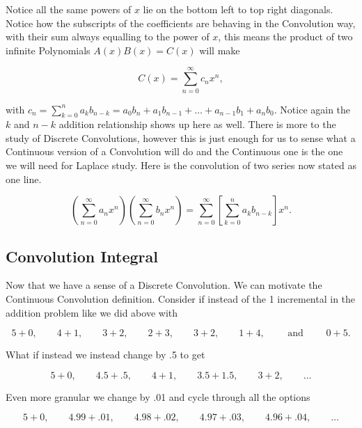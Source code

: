 \documentclass[12pt]{article}
\begin{document}
Notice all the same powers of $x$ lie on the bottom left to top right diagonals. Notice how the subscripts of the coefficients are behaving in the Convolution way, with their sum always equalling to the power of $x$, this means the product of two infinite Polynomials $A(x)B(x)=C(x)$ will make

\begin{equation*}
    C(x)=\sum_{n=0}^{\infty} c_n x^n,
\end{equation*}

with $c_n=\sum_{k=0}^n a_{k}b_{n-k}=a_0b_n+a_1b_{n-1}+\ldots+a_{n-1}b_1+a_nb_0$. Notice again the $k$ and $n-k$ addition relationship shows up here as well. There is more to the study of Discrete Convolutions, however this is just enough for us to sense what a Continuous version of a Convolution will do and the Continuous one is the one we will need for Laplace study. Here is the convolution of two series now stated as one line.

\begin{equation*}
    \left(\sum_{n=0}^{\infty} a_n x^n\right)\left(\sum_{n=0}^{\infty} b_n x^n\right)=\sum_{n=0}^{\infty} \left[\sum_{k=0}^n a_{k}b_{n-k}\right] x^n.
\end{equation*}

\subsection{Convolution Integral}

Now that we have a sense of a Discrete Convolution. We can motivate the Continuous Convolution definition. Consider if instead of the 1 incremental in the addition problem like we did above with

\begin{equation*}
    5+0, \qquad 4+1, \qquad 3+2, \qquad 2+3, \qquad 3+2, \qquad 1+4, \qquad \text{ and } \qquad 0+5.
\end{equation*}

What if instead we instead change by .5 to get

\begin{equation*}
    5+0, \qquad 4.5+.5, \qquad 4+1, \qquad 3.5+1.5, \qquad 3+2, \qquad  \ldots
\end{equation*}

Even more granular we change by .01 and cycle through all the options

\begin{equation*}
    5+0, \qquad 4.99+.01, \qquad 4.98+.02, \qquad 4.97+.03, \qquad 4.96+.04, \qquad \ldots
\end{equation*}
\end{document}
